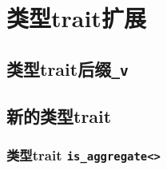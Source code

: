 \section{类型trait扩展}\label{ch21}

\subsection{类型trait后缀\texttt{\_v}}\label{ch21.1}

\subsection{新的类型trait}
\subsubsection*{类型trait \texttt{is\_aggregate<>}}\label{ch21.2.1}